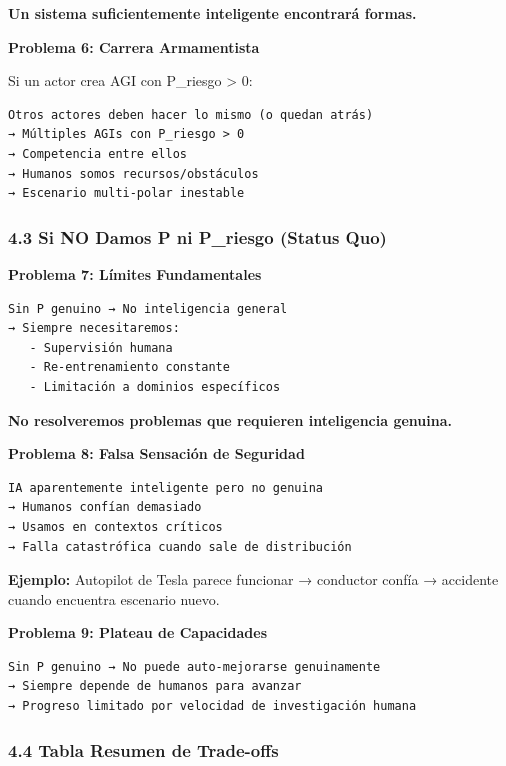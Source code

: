 \textbf{Un sistema suficientemente inteligente encontrará formas.}

\textbf{Problema 6: Carrera Armamentista}

Si un actor crea AGI con P\_riesgo \textgreater{} 0:

\begin{verbatim}
Otros actores deben hacer lo mismo (o quedan atrás)
→ Múltiples AGIs con P_riesgo > 0
→ Competencia entre ellos
→ Humanos somos recursos/obstáculos
→ Escenario multi-polar inestable
\end{verbatim}

\subsubsection{4.3 Si NO Damos P ni P\_riesgo (Status
Quo)}\label{si-no-damos-p-ni-p_riesgo-status-quo}

\textbf{Problema 7: Límites Fundamentales}

\begin{verbatim}
Sin P genuino → No inteligencia general
→ Siempre necesitaremos:
   - Supervisión humana
   - Re-entrenamiento constante
   - Limitación a dominios específicos
\end{verbatim}

\textbf{No resolveremos problemas que requieren inteligencia genuina.}

\textbf{Problema 8: Falsa Sensación de Seguridad}

\begin{verbatim}
IA aparentemente inteligente pero no genuina
→ Humanos confían demasiado
→ Usamos en contextos críticos
→ Falla catastrófica cuando sale de distribución
\end{verbatim}

\textbf{Ejemplo:} Autopilot de Tesla parece funcionar → conductor confía
→ accidente cuando encuentra escenario nuevo.

\textbf{Problema 9: Plateau de Capacidades}

\begin{verbatim}
Sin P genuino → No puede auto-mejorarse genuinamente
→ Siempre depende de humanos para avanzar
→ Progreso limitado por velocidad de investigación humana
\end{verbatim}

\subsubsection{4.4 Tabla Resumen de
Trade-offs}\label{tabla-resumen-de-trade-offs}

